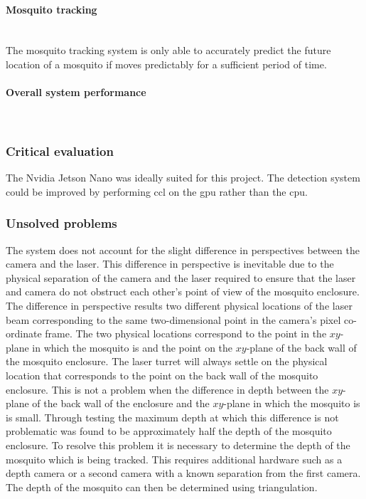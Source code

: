 \paragraph{Mosquito tracking}\hfill\\
The mosquito tracking system is only able to accurately predict the future location of a mosquito if moves predictably for a sufficient period of time.


\paragraph{Overall system performance}\hfill\\

\subsubsection{Critical evaluation}
The Nvidia Jetson Nano was ideally suited for this project. The detection system could be improved by performing \gls{ccl} on the \gls{gpu} rather than the \gls{cpu}.

\subsubsection{Unsolved problems}\label{sec:unsolved_problems}
The system does not account for the slight difference in perspectives between the camera and the laser. This difference in perspective is inevitable due to the physical separation of the camera and the laser required to ensure that the laser and camera do not obstruct each other's point of view of the mosquito enclosure. The difference in perspective results two different physical locations of the laser beam corresponding to the same two-dimensional point in the camera's pixel co-ordinate frame. The two physical locations correspond to the point in the $xy$-plane in which the mosquito is and the point on the $xy$-plane of the back wall of the mosquito enclosure. The laser turret will always settle on the physical location that corresponds to the point on the back wall of the mosquito enclosure. This is not a problem when the difference in depth between the $xy$-plane of the back wall of the enclosure and the $xy$-plane in which the mosquito is is small. Through testing the maximum depth at which this difference is not problematic was found to be approximately half the depth of the mosquito enclosure. To resolve this problem it is necessary to determine the depth of the mosquito which is being tracked. This requires additional hardware such as a depth camera or a second camera with a known separation from the first camera. The depth of the mosquito can then be determined using triangulation.

